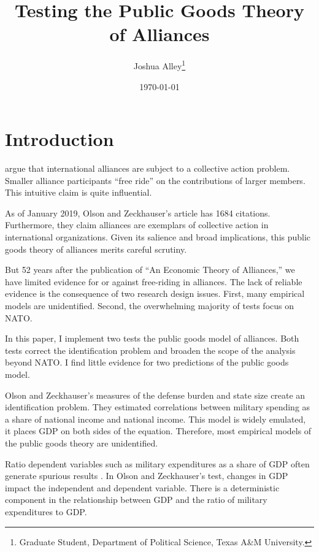 \documentclass[12pt]{article}
\title{
\textbf{Testing the Public Goods Theory of Alliances}
	}
\author{Joshua Alley\footnote{Graduate Student,
Department of Political Science, Texas A\&M University.}}
\date{{\normalsize \today}}
\begin{document}
\maketitle 

\doublespace



\section{Introduction}



\citet{OlsonZeckhauser1966} argue that international alliances are subject to a collective action problem. 
Smaller alliance participants ``free ride'' on the contributions of larger members. 
This intuitive claim is quite influential. 


As of January 2019, Olson and Zeckhauser's article has 1684 citations.
Furthermore, they claim alliances are exemplars of collective action in international organizations. 
Given its salience and broad implications, this public goods theory of alliances merits careful scrutiny. 


But 52 years after the publication of ``An Economic Theory of Alliances,'' we have limited evidence for or against free-riding in alliances. 
The lack of reliable evidence is the consequence of two research design issues. 
First, many empirical models are unidentified.
Second, the overwhelming majority of tests focus on NATO. 


In this paper, I implement two tests the public goods model of alliances. 
Both tests correct the identification problem and broaden the scope of the analysis beyond NATO. 
I find little evidence for two predictions of the public goods model. 


Olson and Zeckhauser's measures of the defense burden and state size create an identification problem. 
They estimated correlations between military spending as a share of national income and national income.
This model is widely emulated, it places GDP on both sides of the equation.
Therefore, most empirical models of the public goods theory are unidentified.


Ratio dependent variables such as military expenditures as a share of GDP often generate spurious results \citep{Kronmal1993}. 
In Olson and Zeckhauser's test, changes in GDP impact the independent and dependent variable. 
There is a deterministic component in the relationship between GDP and the ratio of military expenditures to GDP. 
\end{document}
